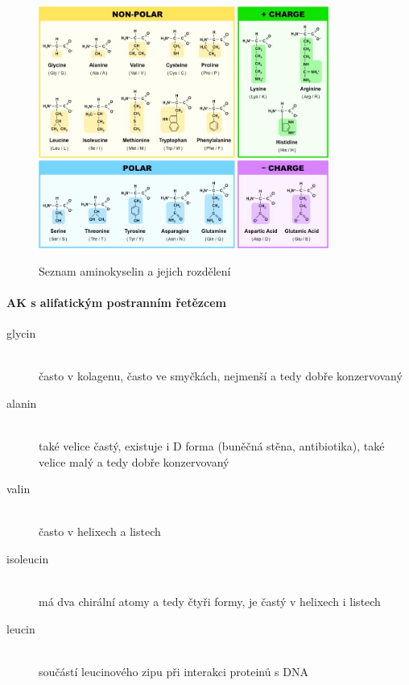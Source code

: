 \documentclass[DIV=8]{scrreprt}
\newcommand{\mybox}[2]{
    \paragraph{#1} #2
}
\begin{document}
\begin{figure}
    \caption{Seznam aminokyselin a jejich rozdělení}
    \includegraphics[width=0.85\textwidth]{ak.jpeg}
    \centering
    \label{}
\end{figure}


\mybox{AK s alifatickým postranním řetězcem}{\begin{description}
\item[glycin]\hfill \\
často v kolagenu, často ve smyčkách, nejmenší a tedy dobře konzervovaný


\item[alanin]\hfill \\
také velice častý, existuje i D forma (buněčná stěna, antibiotika), také velice malý a tedy dobře konzervovaný


\item[valin]\hfill \\
často v helixech a listech


\item[isoleucin]\hfill \\
má dva chirální atomy a tedy čtyři formy, je častý v helixech i listech


\item[leucin]\hfill \\
součástí leucinového zipu při interakci proteinů s DNA

\end{description}
}
\end{document}

